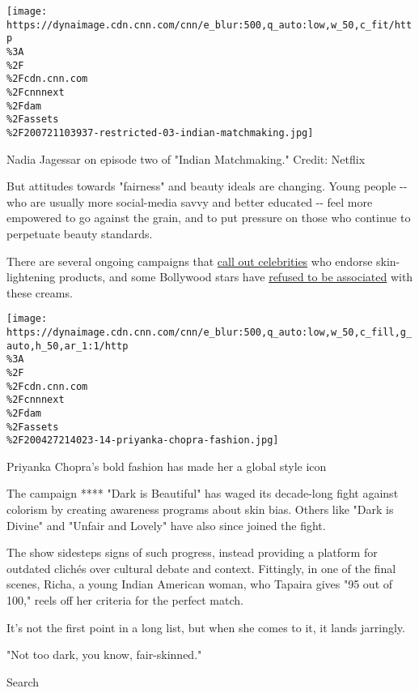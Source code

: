\texttt{[image: https://dynaimage.cdn.cnn.com/cnn/e\_blur:500,q\_auto:low,w\_50,c\_fit/http\\\%3A\\\%2F\\\%2Fcdn.cnn.com\\\%2Fcnnnext\\\%2Fdam\\\%2Fassets\\\%2F200721103937-restricted-03-indian-matchmaking.jpg]}

Nadia Jagessar on episode two of "Indian Matchmaking." Credit: Netflix

But attitudes towards "fairness" and beauty ideals are changing. Young
people -\/- who are usually more social-media savvy and better educated
-\/- feel more empowered to go against the grain, and to put pressure on
those who continue to perpetuate beauty standards.

There are several ongoing campaigns that
\href{https://timesofindia.indiatimes.com/entertainment/hindi/bollywood/photo-features/bollywood-stars-who-refused-to-endorse-fairness-creams/photostory/58161094.cms}{call
out celebrities} who endorse skin-lightening products, and some
Bollywood stars have
\href{https://timesofindia.indiatimes.com/entertainment/hindi/bollywood/photo-features/bollywood-stars-who-refused-to-endorse-fairness-creams/photostory/58161094.cms}{refused
to be associated} with these creams.

\href{/style/article/priyanka-chopra-fashion-intl-hnk/index.html}{}

\texttt{[image: https://dynaimage.cdn.cnn.com/cnn/e\_blur:500,q\_auto:low,w\_50,c\_fill,g\_auto,h\_50,ar\_1:1/http\\\%3A\\\%2F\\\%2Fcdn.cnn.com\\\%2Fcnnnext\\\%2Fdam\\\%2Fassets\\\%2F200427214023-14-priyanka-chopra-fashion.jpg]}

Priyanka Chopra's bold fashion has made her a global style icon

The campaign **** "Dark is Beautiful" has waged its decade-long fight
against colorism by creating awareness programs about skin bias. Others
like "Dark is Divine" and "Unfair and Lovely" have also since joined the
fight.

The show sidesteps signs of such progress, instead providing a platform
for outdated clichés over cultural debate and context. Fittingly, in one
of the final scenes, Richa, a young Indian American woman, who Tapaira
gives "95 out of 100," reels off her criteria for the perfect match.

It's not the first point in a long list, but when she comes to it, it
lands jarringly.

"Not too dark, you know, fair-skinned."

Search

